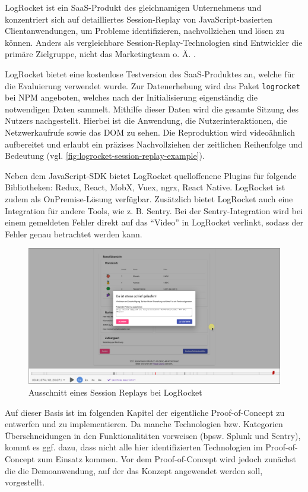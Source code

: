 LogRocket \cite{LogRocket} ist ein SaaS-Produkt des gleichnamigen Unternehmens und konzentriert sich auf detailliertes Session-Replay von JavaScript-basierten Clientanwendungen, um Probleme identifizieren, nachvollziehen und lösen zu können. Anders als vergleichbare Session-Replay-Technologien sind Entwickler die primäre Zielgruppe, nicht das Marketingteam o. Ä. \cite{Webalyt}.

LogRocket bietet eine kostenlose Testversion des SaaS-Produktes an, welche für die Evaluierung verwendet wurde. Zur Datenerhebung wird das Paket \texttt{logrocket} bei NPM angeboten, welches nach der Initialisierung eigenständig die notwendigen Daten sammelt. Mithilfe dieser Daten wird die gesamte Sitzung des Nutzers nachgestellt. Hierbei ist die Anwendung, die Nutzerinteraktionen, die Netzwerkaufrufe sowie das DOM zu sehen. Die Reproduktion wird videoähnlich aufbereitet und erlaubt ein präzises Nachvollziehen der zeitlichen Reihenfolge und Bedeutung (vgl. \autoref{fig:logrocket-session-replay-example}).

Neben dem JavaScript-SDK bietet LogRocket quelloffenene Plugins für folgende Bibliotheken: Redux, React, MobX, Vuex, ngrx, React Native. LogRocket ist zudem als OnPremise-Lösung verfügbar. Zusätzlich bietet LogRocket auch eine Integration für andere Tools, wie z. B. Sentry. Bei der Sentry-Integration wird bei einem gemeldeten Fehler direkt auf das \enquote{Video} in LogRocket verlinkt, sodass der Fehler genau betrachtet werden kann.

\begin{figure}[H]
	\centering
	\includegraphics[width=\linewidth]{img/03_methoden/logrocket_session-replay-example-cropped.png}
	\caption{Ausschnitt eines Session Replays bei LogRocket}
	\label{fig:logrocket-session-replay-example}
\end{figure}

\vspace{\baselineskip}

Auf dieser Basis ist im folgenden Kapitel der eigentliche Proof-of-Concept zu entwerfen und zu implementieren. Da manche Technologien bzw. Kategorien Überschneidungen in den Funktionalitäten vorweisen (bpsw. Splunk und Sentry), kommt es ggf. dazu, dass nicht alle hier identifizierten Technologien im Proof-of-Concept zum Einsatz kommen. Vor dem Proof-of-Concept wird jedoch zunächst die die Demoanwendung, auf der das Konzept angewendet werden soll, vorgestellt.